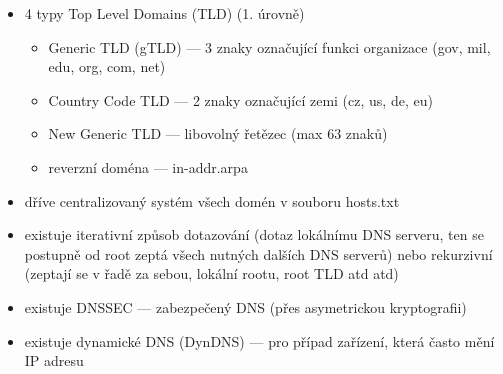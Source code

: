 \begin{itemize}
	\item 4 typy Top Level Domains (TLD) (1. úrovně)
	\begin{itemize}
		\item Generic TLD (gTLD) --- 3 znaky označující funkci organizace (gov, mil, edu, org, com, net)
		\item Country Code TLD --- 2 znaky označující zemi (cz, us, de, eu)
		\item New Generic TLD --- libovolný řetězec (max 63 znaků)
		\item reverzní doména --- in-addr.arpa
	\end{itemize}
	\item dříve centralizovaný systém všech domén v souboru hosts.txt
	\item existuje iterativní způsob dotazování (dotaz lokálnímu DNS serveru, ten se postupně od root zeptá všech nutných dalších DNS serverů) nebo rekurzivní (zeptají se v řadě za sebou, lokální rootu, root TLD atd atd)
	\item existuje DNSSEC --- zabezpečený DNS (přes asymetrickou kryptografii)
	\item existuje dynamické DNS (DynDNS) --- pro případ zařízení, která často mění IP adresu
\end{itemize}
